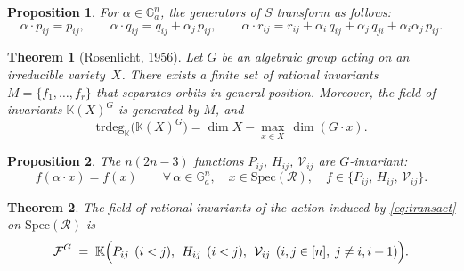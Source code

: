 \documentclass[10pt,a4paper]{amsart}
\newtheorem{proposition}{Proposition}
\newtheorem{theorem}{Theorem}
\newcommand{\K}{\mathbb{K}}
\begin{document}
\begin{proposition}\label{prop:transformation-rules}
For $\alpha \in \mathbb{G}_a^n$, the generators of $S$ transform as follows:
\begin{equation}\label{eq:transform}
\alpha \cdot p_{ij} = p_{ij}, \qquad
\alpha \cdot q_{ij} = q_{ij} + \alpha_j\, p_{ij}, \qquad
\alpha \cdot r_{ij} = r_{ij} + \alpha_i\, q_{ij} + \alpha_j\, q_{ji} + \alpha_i \alpha_j\, p_{ij}.
\end{equation}
\end{proposition}

\begin{theorem}[Rosenlicht, 1956] \label{thm: Rosenlicht}
Let $G$ be an algebraic group acting on an irreducible variety~$X$.
There exists a finite set of rational invariants $M = \{f_1,\ldots,f_r\}$ that
separates orbits in general position. Moreover, the field of invariants
$\K(X)^G$ is generated by $M$, and
\begin{equation}\label{eq: trdegInvField}
\mathrm{trdeg}_\K\bigl(\K(X)^G\bigr)
  =
  \dim X - \max_{x\in X}\, \dim(G\cdot x).    
\end{equation}
\end{theorem}

\begin{proposition}\label{prop: inv}
The $n(2n-3)$  functions $P_{ij}$, $H_{ij}$, $\mathcal{V}_{ij}$ are $G$-invariant:
\[
  f(\alpha\cdot x) = f(x)
  \qquad
  \forall\,\alpha\in \mathbb{G}_a^n,\quad x\in \mathrm{Spec}(\mathcal{R}),\quad
  f\in\{P_{ij},\,H_{ij},\,\mathcal{V}_{ij}\}.
\]
\end{proposition}

\begin{theorem}\label{thm: main}
The field of rational invariants of the action induced by
\eqref{eq:transact} on $\mathrm{Spec}(\mathcal{R})$ is
\[
  \mathcal{F}^{G}
  \;=\;
  \K\Bigl(
    P_{ij}\;\,(i<j),\;\,
    H_{ij}\;\,(i<j),\;\,
    \mathcal{V}_{ij}\;\,(i,j\in[n],\;j\neq i,i+1)
  \Bigr).
\]
\end{theorem}
\end{document}
